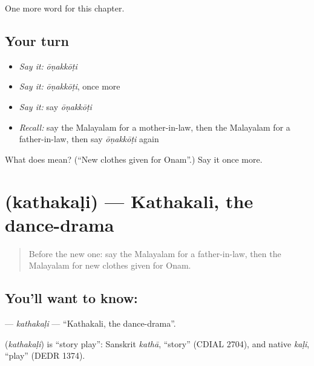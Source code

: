 \begin{grammarlens}[title={What you've built}]
One more word for this chapter.
\end{grammarlens}

\subsection*{Your turn}
\begin{itemize}
\raggedright
  \item \emph{Say it:} \emph{ōṇakkōṭi}
  \item \emph{Say it:} \emph{ōṇakkōṭi}, once more
  \item \emph{Say it:} say \emph{ōṇakkōṭi}
  \item \emph{Recall:} say the Malayalam for a mother-in-law, then the Malayalam for a father-in-law, then say \emph{ōṇakkōṭi} again
\end{itemize}

\begin{tcolorbox}[breakable,colback=teal!4,colframe=teal!35!black,title={Before you move on}]
What does  mean? (\textquotedblleft{}New clothes given for Onam\textquotedblright{}.) Say it once more.
\end{tcolorbox}
\section[\texorpdfstring{\ml{കഥകളി} (kathakaḷi)}{കഥകളി (kathakaḷi)}]{ (kathakaḷi) — Kathakali, the dance-drama}

\label{lesson:ML-C290-kathakali}



\begin{quote}
Before the new one: say the Malayalam for a father-in-law, then the Malayalam for new clothes given for Onam.
\end{quote}

\subsection*{You'll want to know: }
\textbf{} — \emph{kathakaḷi} — \textquotedblleft{}Kathakali, the dance-drama\textquotedblright{}.

\begin{cousinweb}
\textbf{} (\emph{kathakaḷi}) is \textquotedblleft{}story play\textquotedblright{}: Sanskrit \emph{kathā}, \textquotedblleft{}story\textquotedblright{} (CDIAL 2704), and native \emph{kaḷi}, \textquotedblleft{}play\textquotedblright{} (DEDR 1374).
\end{cousinweb}

